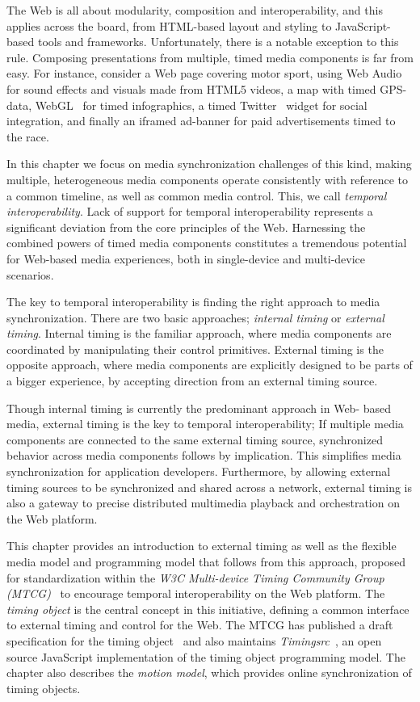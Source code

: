 The Web is all about modularity, composition and interoperability, and this
applies across the board, from HTML-based layout and styling to JavaScript-
based  tools and frameworks. Unfortunately, there is a notable exception to
this rule. Composing presentations from multiple, timed media components is
far from easy. For instance, consider a Web page covering motor sport, using
Web Audio~\cite{webaudio} for sound effects and visuals made from HTML5
videos, a map with timed GPS-data, WebGL~\cite{webgl} for timed infographics,
a timed Twitter~\cite{twitter} widget for social integration, and finally an
iframed ad-banner for paid advertisements timed to the race.

In this chapter we focus on media synchronization challenges of this kind,
making multiple, heterogeneous media components operate consistently with
reference to a common timeline, as well as common media control. This, we call
\emph{temporal interoperability}. Lack of support for temporal
interoperability represents a significant deviation from the core principles
of the Web. Harnessing the combined powers of timed media components
constitutes a tremendous potential for Web-based media experiences, both in
single-device and multi-device scenarios.

The key to temporal interoperability is finding the right approach to media
synchronization. There are two basic approaches; \emph{internal
timing} or \emph{external timing}. Internal timing
is the familiar approach, where media components are coordinated by
manipulating their control primitives. External timing is the
opposite approach, where media components are explicitly designed to be parts
of a bigger experience, by accepting direction from an external timing source.

Though internal timing is currently the predominant approach in Web-
based media, external timing is the key to temporal interoperability;
If multiple media components are connected to the same external timing source,
synchronized behavior across media components follows by implication. This
simplifies media synchronization for application developers. Furthermore,
by allowing external timing sources to be synchronized and shared across a
network, external timing is also a gateway to precise distributed multimedia
playback and orchestration on the Web platform.

This chapter provides an introduction to external timing as well as the
flexible media model and programming model that follows from this approach,
proposed for standardization within the \emph{W3C Multi-device Timing
Community Group (MTCG)}~\cite{mtcg} to encourage temporal interoperability on
the Web platform. The \emph{timing object} is the central concept in this
initiative, defining a common interface to external timing and control for the
Web. The MTCG has published a draft specification for the timing
object~\cite{timingobject} and also maintains
\emph{Timingsrc}~\cite{timingsrc}, an open source JavaScript implementation of
the timing object programming model. The chapter also describes the
\emph{motion model}, which provides online synchronization of timing objects.

